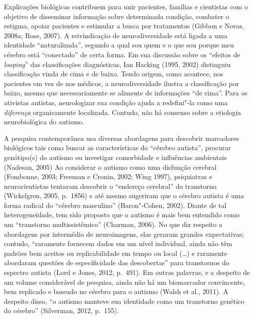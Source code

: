 Explicações biológicas contribuem para unir pacientes, famílias e
cientistas com o objetivo de disseminar informação sobre determinada
condição, combater o estigma, apoiar pacientes e estimular a busca por
tratamentos (Gibbon e Novas, 2008a; Rose, 2007). A reivindicação de
neurodiversidade está ligada a uma identidade ``naturalizada'', segundo
a qual sou quem e o que sou porque meu cérebro está ``conectado'' de
certa forma. Em sua discussão sobre os ``efeitos de \emph{looping}'' das
classificações diagnósticas, Ian Hacking (1995, 2002) distinguiu
classificação vinda de cima e de baixo. Tendo origem, como acontece, nos
pacientes em vez de nos médicos, a neurodiversidade ilustra a
classificação por baixo, mesmo que necessariamente se alimente de
informações ``de cima''. Para os ativistas autistas, neurologizar sua
condição ajuda a redefini"-la como uma \emph{diferença} organicamente
localizada. Contudo, não há consenso sobre a etiologia neurobiológica do
autismo.

A pesquisa contemporânea usa diversas abordagens para descobrir
marcadores biológicos tais como buscar as características do ``cérebro
autista'', procurar genótipo(s) do autismo ou investigar comorbidade e
influências ambientais (Nadesan, 2005) Ao considerar o autismo como uma
disfunção cerebral (Fombonne, 2003; Freeman e Cronin, 2002; Wing 1997),
psiquiatras e neurocientistas tentaram descobrir o ``endereço cerebral''
do transtorno (Wickelgren, 2005, p.~1856) e até mesmo sugeriram que o
cérebro autista é uma forma radical do ``cérebro masculino''
(Baron"-Cohen, 2002). Diante de tal heterogeneidade, tem sido proposto
que o autismo é mais bem entendido como um ``transtorno
multissistêmico'' (Charman, 2006). No que diz respeito a abordagens por
intermédio de neuroimagens, elas geraram grandes expectativas; contudo,
``raramente fornecem dados em um nível individual, ainda não têm padrões
bem aceitos ou replicabilidade em tempo ou local (\ldots{}) e raramente
abordaram questões de especificidade das descobertas'' para transtornos
do espectro autista (Lord e Jones, 2012, p.~491). Em outras palavras, e a
despeito de um volume considerável de pesquisa, ainda não há um
biomarcador convincente, bem replicado e baseado no cérebro para o
autismo (Walsh et al., 2011). A despeito disso, ``o autismo manteve sua
identidade como um transtorno genético do cérebro'' (Silverman, 2012,
p.~155).

